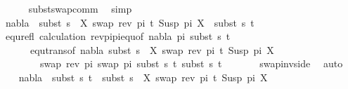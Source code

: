 \begin{isabellebody}
\ \ \ \ \isamarkupfalse%
\ subst{\isacharunderscore}{\kern0pt}swap{\isacharunderscore}{\kern0pt}comm\ \isamarkupfalse%
\ simp\isanewline
\ \ \isamarkupfalse%
\ {\isachardoublequoteopen}nabla{}\ {\isasymturnstile}\ subst\ {\isacharparenleft}{\kern0pt}s{}\ {\isasymbullet}\ {\isacharbrackleft}{\kern0pt}{\isacharparenleft}{\kern0pt}X{\isacharcomma}{\kern0pt}\ swap\ {\isacharparenleft}{\kern0pt}rev\ pi{\isacharparenright}{\kern0pt}\ t{\isacharprime}{\kern0pt}{\isacharparenright}{\kern0pt}{\isacharbrackright}{\kern0pt}{\isacharparenright}{\kern0pt}\ {\isacharparenleft}{\kern0pt}Susp\ pi\ X{\isacharparenright}{\kern0pt}\ {\isasymapprox}\ subst\ s{}\ t{\isacharprime}{\kern0pt}{\isachardoublequoteclose}\isanewline
\ \ \ \ \isamarkupfalse%
\ equ{\isacharunderscore}{\kern0pt}refl\ calculation\ rev{\isacharunderscore}{\kern0pt}pi{\isacharunderscore}{\kern0pt}pi{\isacharunderscore}{\kern0pt}equ{\isacharbrackleft}{\kern0pt}of\ nabla{}\ pi\ {\isacartoucheopen}subst\ s{}\ t{\isacharprime}{\kern0pt}{\isacartoucheclose}{\isacharbrackright}{\kern0pt}\isanewline
\ \ \ \ \ \ equ{\isacharunderscore}{\kern0pt}trans{\isacharbrackleft}{\kern0pt}of\ nabla{}\ {\isacartoucheopen}subst\ {\isacharparenleft}{\kern0pt}s{}\ {\isasymbullet}\ {\isacharbrackleft}{\kern0pt}{\isacharparenleft}{\kern0pt}X{\isacharcomma}{\kern0pt}\ swap\ {\isacharparenleft}{\kern0pt}rev\ pi{\isacharparenright}{\kern0pt}\ t{\isacharprime}{\kern0pt}{\isacharparenright}{\kern0pt}{\isacharbrackright}{\kern0pt}{\isacharparenright}{\kern0pt}\ {\isacharparenleft}{\kern0pt}Susp\ pi\ X{\isacharparenright}{\kern0pt}{\isacartoucheclose}\ \isanewline
\ \ \ \ \ \ \ \ {\isacartoucheopen}swap\ {\isacharparenleft}{\kern0pt}rev\ pi{\isacharparenright}{\kern0pt}\ {\isacharparenleft}{\kern0pt}swap\ pi\ {\isacharparenleft}{\kern0pt}subst\ s{}\ t{\isacharprime}{\kern0pt}{\isacharparenright}{\kern0pt}{\isacharparenright}{\kern0pt}{\isacartoucheclose}\ {\isacartoucheopen}subst\ s{}\ t{\isacharprime}{\kern0pt}{\isacartoucheclose}{\isacharbrackright}{\kern0pt}\isanewline
\ \ \ \ \ \ \ swap{\isacharunderscore}{\kern0pt}inv{\isacharunderscore}{\kern0pt}side\ \isamarkupfalse%
\ auto\isanewline
\ \ \isamarkupfalse%
\ {\isachardoublequoteopen}nabla{}\ {\isasymturnstile}\ subst\ s{}\ t{\isacharprime}{\kern0pt}\ {\isasymapprox}\ subst\ {\isacharparenleft}{\kern0pt}s{}\ {\isasymbullet}\ {\isacharbrackleft}{\kern0pt}{\isacharparenleft}{\kern0pt}X{\isacharcomma}{\kern0pt}\ swap\ {\isacharparenleft}{\kern0pt}rev\ pi{\isacharparenright}{\kern0pt}\ t{\isacharprime}{\kern0pt}{\isacharparenright}{\kern0pt}{\isacharbrackright}{\kern0pt}{\isacharparenright}{\kern0pt}\ {\isacharparenleft}{\kern0pt}Susp\ pi\ X{\isacharparenright}{\kern0pt}{\isachardoublequoteclose}\isanewline

\end{isabellebody}
